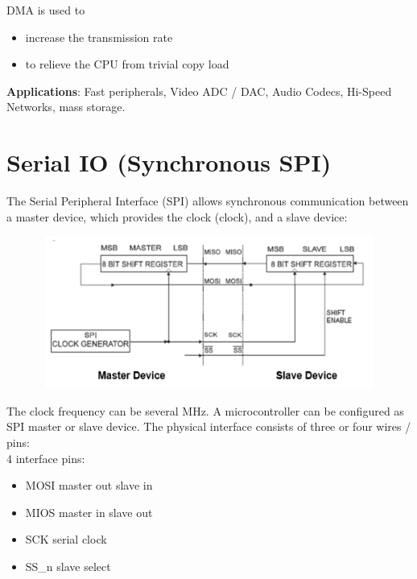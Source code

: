 DMA is used to

\begin{itemize}
\item  increase the transmission rate
\item  to relieve the CPU from trivial copy load
\end{itemize}

\textbf{Applications}: Fast peripherals, Video ADC / DAC, Audio Codecs, Hi-Speed Networks,          mass storage.

\section{Serial IO (Synchronous SPI)}

The Serial Peripheral Interface (SPI) allows synchronous communication between a master device, which provides the clock (clock), and a slave device:

    \begin{figure}[h]
    \centering
    \includegraphics[width=12cm, height=5cm]{Images/image44.png}
    \label{fig:Fig 141}
    \end{figure}
    
The clock frequency can be several MHz. A microcontroller can be configured as SPI master or slave device. The physical interface consists of three or four wires / pins:\\

4 interface pins:

\begin{multicols}{2}
	\begin{itemize}
		\item  MOSI  master out slave in
		\item  MIOS  master in slave out 
	\end{itemize}
	\columnbreak
	\begin{itemize}
		\item  SCK   serial clock
		\item  SS\_n  slave select
	\end{itemize}
	\columnbreak
\end{multicols}	

